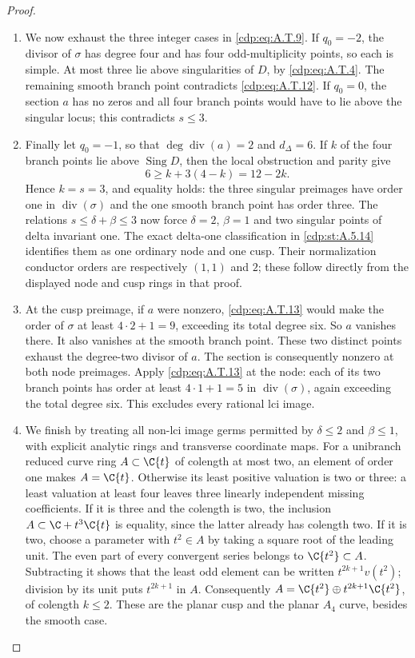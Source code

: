 \begin{proof}
\begin{enumerate}[label={$\langle1\rangle$\arabic*.},leftmargin=*]
\item We now exhaust the three integer cases in \eqref{cdp:eq:A.T.9}.
If $q_0=-2$, the divisor of $\sigma$ has degree four
and has four odd-multiplicity points, so each is
simple. At most three lie above singularities of
$D$, by \eqref{cdp:eq:A.T.4}. The remaining smooth branch point
contradicts \eqref{cdp:eq:A.T.12}.
If $q_0=0$, the section $a$ has no zeros and all
four branch points would have to lie above the
singular locus; this contradicts $s\le3$.

\item Finally let $q_0=-1$, so that $\deg\operatorname{div}(a)=2$
and $d_\Delta=6$. If $k$ of the four branch points
lie above $\operatorname{Sing}D$, then the local
obstruction and parity give
\[
               6\ge k+3(4-k)=12-2k.
\]
Hence $k=s=3$, and equality holds: the three singular
preimages have order one in $\operatorname{div}(\sigma)$
and the one smooth branch point has order three.
The relations $s\le\delta+\beta\le3$ now force
$\delta=2$, $\beta=1$ and two singular points of
delta invariant one. The exact delta-one
classification in \ref{cdp:st:A.5.14} identifies them as one
ordinary node and one cusp. Their normalization
conductor orders are respectively $(1,1)$ and $2$;
these follow directly from the displayed node and
cusp rings in that proof.

\item At the cusp preimage, if $a$ were nonzero,
\eqref{cdp:eq:A.T.13} would make the order of $\sigma$ at least
$4\cdot2+1=9$, exceeding its total degree six.
So $a$ vanishes there. It also vanishes at the
smooth branch point. These two distinct points
exhaust the degree-two divisor of $a$. The section
is consequently nonzero at both node preimages.
Apply \eqref{cdp:eq:A.T.13} at the node: each of its two branch
points has order at least $4\cdot1+1=5$ in
$\operatorname{div}(\sigma)$, again exceeding the
total degree six. This excludes every rational lci image.

\item We finish by treating all non-lci image germs permitted
by $\delta\le2$ and $\beta\le1$, with explicit analytic
rings and transverse coordinate maps. For a unibranch
reduced curve ring $A\subset\C\{t\}$ of colength at
most two, an element of order one makes $A=\C\{t\}$.
Otherwise its least positive valuation is two or three:
a least valuation at least four leaves three linearly
independent missing coefficients. If it is three and
the colength is two, the inclusion
$A\subset\C+t^3\C\{t\}$ is equality, since the latter
already has colength two. If it is two, choose a
parameter with $t^2\in A$ by taking a square root of
the leading unit. The even part of every convergent
series belongs to $\C\{t^2\}\subset A$. Subtracting
it shows that the least odd element can be written
$t^{2k+1}v(t^2)$; division by its unit puts
$t^{2k+1}$ in $A$. Consequently
$A=\C\{t^2\}\oplus t^{2k+1}\C\{t^2\}$, of colength
$k\le2$. These are the planar cusp and the planar
$A_4$ curve, besides the smooth case.


\end{enumerate}
\end{proof}
